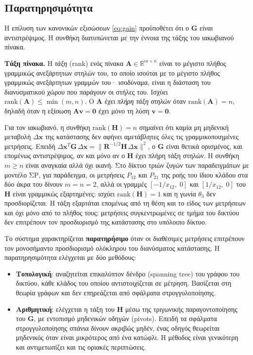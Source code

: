 \subsection{Παρατηρησιμότητα}
\label{sec:observability}

Η επίλυση των κανονικών εξισώσεων \eqref{eq:gain} προϋποθέτει ότι ο $\mathbf{G}$ είναι
αντιστρέψιμος. Η συνθήκη διατυπώνεται με την έννοια της τάξης του ιακωβιανού πίνακα.

\textbf{Τάξη πίνακα.} Η \emph{τάξη} (rank) ενός πίνακα $\mathbf{A} \in \mathbb{R}^{m \times n}$
είναι το μέγιστο πλήθος γραμμικώς ανεξάρτητων στηλών του, το οποίο ισούται με το μέγιστο
πλήθος γραμμικώς ανεξάρτητων γραμμών του· ισοδύναμα, είναι η διάσταση του διανυσματικού χώρου
που παράγουν οι στήλες του. Ισχύει $\mathrm{rank}(\mathbf{A}) \le \min(m, n)$. Ο $\mathbf{A}$
έχει \emph{πλήρη τάξη στηλών} όταν $\mathrm{rank}(\mathbf{A}) = n$, δηλαδή όταν η εξίσωση
$\mathbf{A}\mathbf{v} = \mathbf{0}$ έχει μόνο τη λύση $\mathbf{v} = \mathbf{0}$.

Για τον ιακωβιανό, η συνθήκη $\mathrm{rank}(\mathbf{H}) = n$ σημαίνει ότι καμία μη μηδενική
μεταβολή $\Delta\mathbf{x}$ της κατάστασης δεν αφήνει αμετάβλητες όλες τις γραμμικοποιημένες
μετρήσεις. Επειδή
$\Delta\mathbf{x}^{T}\mathbf{G}\,\Delta\mathbf{x} = \|\mathbf{R}^{-1/2}\mathbf{H}\,\Delta\mathbf{x}\|^{2}$,
ο $\mathbf{G}$ είναι θετικά ορισμένος, και επομένως αντιστρέψιμος, αν και μόνο αν ο
$\mathbf{H}$ έχει πλήρη τάξη στηλών. Η συνθήκη $m \ge n$ είναι αναγκαία αλλά όχι ικανή. Στο
δίκτυο τριών ζυγών των παραδειγμάτων με μοντέλο ΣΡ, για παράδειγμα, οι μετρήσεις $P_{12}$ και
$P_{21}$ της ροής του ίδιου κλάδου στα δύο άκρα του δίνουν $m = n = 2$, αλλά οι γραμμές
$[-1/x_{12},\; 0]$ και $[1/x_{12},\; 0]$ του $\mathbf{H}$ είναι γραμμικώς εξαρτημένες: ισχύει
$\mathrm{rank}(\mathbf{H}) = 1$ και η γωνία $\theta_3$ δεν προσδιορίζεται. Η τάξη εξαρτάται
επομένως από τη θέση και το είδος των μετρήσεων και όχι μόνο από το πλήθος τους: μετρήσεις
συγκεντρωμένες σε τμήμα του δικτύου δεν επιτρέπουν τον προσδιορισμό της κατάστασης στο
υπόλοιπο δίκτυο.

Το σύστημα χαρακτηρίζεται \textbf{παρατηρήσιμο} όταν οι διαθέσιμες μετρήσεις επιτρέπουν τον
μονοσήμαντο προσδιορισμό ολόκληρου του διανύσματος κατάστασης. Η παρατηρησιμότητα ελέγχεται
με δύο μεθόδους:

\begin{itemize}
\item \textbf{Τοπολογική}: αναζητείται επικαλύπτον δένδρο (spanning tree) του γράφου του
      δικτύου, κάθε κλάδος του οποίου αντιστοιχίζεται σε μέτρηση. Βασίζεται στη θεωρία
      γράφων και δεν επηρεάζεται από σφάλματα στρογγυλοποίησης.
\item \textbf{Αριθμητική}: ελέγχεται η τάξη του $\mathbf{H}$ μέσω της τριγωνικής
      παραγοντοποίησης του $\mathbf{G}$, με εντοπισμό μηδενικών οδηγών (pivots). Επειδή τα
      σφάλματα στρογγυλοποίησης σπάνια δίνουν ακριβώς μηδέν, ένας οδηγός θεωρείται μηδενικός
      όταν είναι μικρότερος από ένα κατώφλι. Η μέθοδος είναι γενικότερη και αντιμετωπίζει και
      τις οριακές περιπτώσεις.
\end{itemize}

